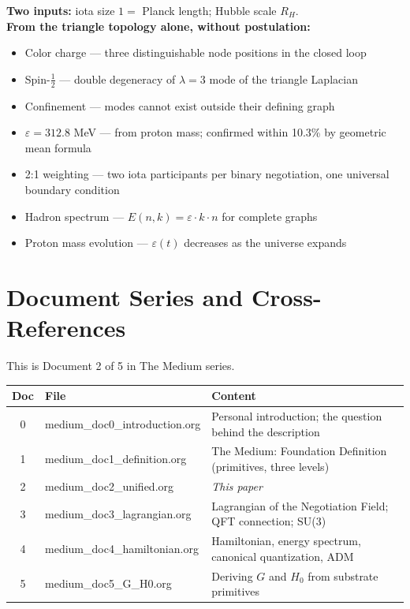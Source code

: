 \documentclass[11pt,letterpaper]{article}
\newenvironment{defbox}{\begin{tcolorbox}[colback=green!3!white,colframe=green!45!black,title={\small\textit{Foundational definition}},breakable]}{\end{tcolorbox}}
\begin{document}
\begin{defbox}
\textbf{Two inputs:} iota size $1 =$ Planck length; Hubble scale $R_H$. \\[4pt]
\textbf{From the triangle topology alone, without postulation:}
\begin{itemize}\setlength\itemsep{2pt}
\item Color charge --- three distinguishable node positions in the closed loop
\item Spin-$\frac{1}{2}$ --- double degeneracy of $\lambda = 3$ mode of the triangle Laplacian
\item Confinement --- modes cannot exist outside their defining graph
\item $\varepsilon = 312.8$ MeV --- from proton mass; confirmed within 10.3\% by geometric mean formula
\item 2:1 weighting --- two iota participants per binary negotiation, one universal boundary condition
\item Hadron spectrum --- $E(n,k) = \varepsilon \cdot k \cdot n$ for complete graphs
\item Proton mass evolution --- $\varepsilon(t)$ decreases as the universe expands
\end{itemize}
\end{defbox}

\section{Document Series and Cross-References}
\label{sec:orgaefad06}

This is Document 2 of 5 in The Medium series.

\begin{center}
\begin{tabular}{clp{9cm}}
\toprule
\textbf{Doc} & \textbf{File} & \textbf{Content}\\[0pt]
\midrule
0 & medium\_doc0\_introduction.org & Personal introduction; the question behind the description\\[0pt]
1 & medium\_doc1\_definition.org & The Medium: Foundation Definition (primitives, three levels)\\[0pt]
2 & medium\_doc2\_unified.org & \emph{This paper}\\[0pt]
3 & medium\_doc3\_lagrangian.org & Lagrangian of the Negotiation Field; QFT connection; SU(3)\\[0pt]
4 & medium\_doc4\_hamiltonian.org & Hamiltonian, energy spectrum, canonical quantization, ADM\\[0pt]
5 & medium\_doc5\_G\_H0.org & Deriving \(G\) and \(H_0\) from substrate primitives\\[0pt]
\bottomrule
\end{tabular}
\end{center}
\end{document}

